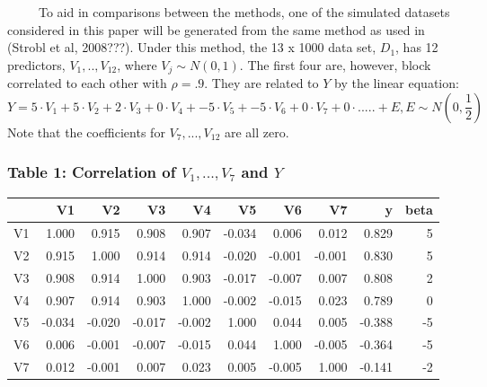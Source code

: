\documentclass[12pt,twoside]{reedthesis}
\begin{document}
  ~~~~~To aid in comparisons between the methods, one of the simulated
  datasets considered in this paper will be generated from the same method
  as used in (Strobl et al, 2008???). Under this method, the 13 x 1000
  data set, \(D_1\), has 12 predictors, \(V_1,..,V_{12}\), where
  \(V_j \sim N(0,1)\). The first four are, however, block correlated to
  each other with \(\rho = .9\). They are related to \(Y\) by the linear
  equation:
  \[Y = 5 \cdot V_1 + 5 \cdot V_2 + 2 \cdot V_3 + 0 \cdot V_4 + -5 \cdot V_5 + -5\cdot V_6 + 0\cdot V_7 + 0 \cdot ..... + E, E \sim N(0,\frac 1 2 )\]
  Note that the coefficients for \(V_7,...,V_{12}\) are all zero.
  
  \subsubsection{\texorpdfstring{Table 1: Correlation of \(V_1,..., V_7\)
  and
  \(Y\)}{Table 1: Correlation of V\_1,..., V\_7 and Y}}\label{table-1-correlation-of-v_1...-v_7-and-y}
  
  \begin{tabular}{l|r|r|r|r|r|r|r|r|r}
  \hline
    & V1 & V2 & V3 & V4 & V5 & V6 & V7 & y & beta\\
  \hline
  V1 & 1.000 & 0.915 & 0.908 & 0.907 & -0.034 & 0.006 & 0.012 & 0.829 & 5\\
  \hline
  V2 & 0.915 & 1.000 & 0.914 & 0.914 & -0.020 & -0.001 & -0.001 & 0.830 & 5\\
  \hline
  V3 & 0.908 & 0.914 & 1.000 & 0.903 & -0.017 & -0.007 & 0.007 & 0.808 & 2\\
  \hline
  V4 & 0.907 & 0.914 & 0.903 & 1.000 & -0.002 & -0.015 & 0.023 & 0.789 & 0\\
  \hline
  V5 & -0.034 & -0.020 & -0.017 & -0.002 & 1.000 & 0.044 & 0.005 & -0.388 & -5\\
  \hline
  V6 & 0.006 & -0.001 & -0.007 & -0.015 & 0.044 & 1.000 & -0.005 & -0.364 & -5\\
  \hline
  V7 & 0.012 & -0.001 & 0.007 & 0.023 & 0.005 & -0.005 & 1.000 & -0.141 & -2\\
  \hline
  \end{tabular}
  
\end{document}
